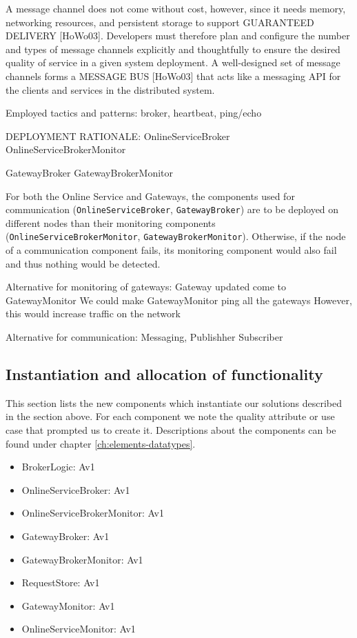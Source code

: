     A message channel does not come without cost, however, since it
    needs memory, networking resources, and persistent storage to support
    GUARANTEED DELIVERY [HoWo03]. Developers must therefore plan
    and configure the number and types of message channels explicitly
    and thoughtfully to ensure the desired quality of service in a given
    system deployment. A well-designed set of message channels forms a
    MESSAGE BUS [HoWo03] that acts like a messaging API for the clients
    and services in the distributed system.

    Employed tactics and patterns: broker, heartbeat, ping/echo

    DEPLOYMENT RATIONALE:
        OnlineServiceBroker
        OnlineServiceBrokerMonitor

        GatewayBroker
        GatewayBrokerMonitor

        For both the Online Service and Gateways, the components used for communication
        (\texttt{OnlineServiceBroker}, \texttt{GatewayBroker}) are to be deployed on different nodes than
        their monitoring components (\texttt{OnlineServiceBrokerMonitor}, \texttt{GatewayBrokerMonitor}).
        Otherwise, if the node of a communication
        component fails, its monitoring component would also fail and thus
        nothing would be detected.

    Alternative for monitoring of gateways:
        Gateway updated come to GatewayMonitor
        We could make GatewayMonitor ping all the gateways
        However, this would increase traffic on the network

    Alternative for communication:
        Messaging, Publishher Subscriber


\subsection{Instantiation and allocation of functionality}
    This section lists the new components which instantiate our solutions
    described in the section above. For each component we note the quality
    attribute or use case that prompted us to create it. Descriptions about
    the components can be found under chapter \ref{ch:elements-datatypes}. \\

    \begin{itemize}
        \item BrokerLogic: Av1
        \item OnlineServiceBroker: Av1
        \item OnlineServiceBrokerMonitor: Av1
        \item GatewayBroker: Av1
        \item GatewayBrokerMonitor: Av1
        \item RequestStore: Av1
        \item GatewayMonitor: Av1
        \item OnlineServiceMonitor: Av1
    \end{itemize}



